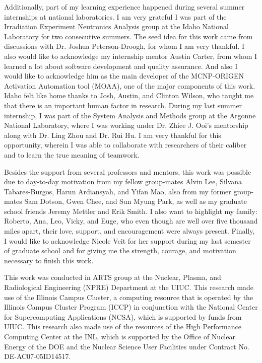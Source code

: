 \documentclass{uiucthesis2021}
\begin{document}
\begin{acknowledgments}
Additionally, part of my learning experience happened during several summer internships at national laboratories.
I am very grateful I was part of the Irradiation Experiment Neutronics Analysis group at the Idaho National Laboratory for two consecutive summers.
The seed idea for this work came from discussions with Dr. Joshua Peterson-Droogh, for whom I am very thankful.
I also would like to acknowledge my internship mentor Austin Carter, from whom I learned a lot about software development and quality assurance.
And also I would like to acknowledge him as the main developer of the MCNP-ORIGEN Activation Automation tool (MOAA), one of the major components of this work.
Idaho felt like home thanks to Josh, Austin, and Clinton Wilson, who taught me that there is an important human factor in research.
During my last summer internship, I was part of the System Analysis and Methods group at the Argonne National Laboratory, where I was working under Dr. Zhiee J. Ooi's mentorship along with Dr. Ling Zhou and Dr. Rui Hu.
I am very thankful for this opportunity, wherein I was able to collaborate with researchers of their caliber and to learn the true meaning of teamwork.

Besides the support from several professors and mentors, this work was possible due to day-to-day motivation from my fellow group-mates Alvin Lee, Silvana Tabares-Burgos, Harun Ardiansyah, and Yifan Mao, also from my former group-mates Sam Dotson, Gwen Chee, and Sun Myung Park, as well as my graduate school friends Jeremy Mettler and Erik Smith.
I also want to highlight my family: Roberto, Ana, Leo, Vicky, and Euge, who even though are well over five thousand miles apart, their love, support, and encouragement were always present.
Finally, I would like to acknowledge Nicole Veit for her support during my last semester of graduate school and for giving me the strength, courage, and motivation necessary to finish this work.

This work was conducted in ARTS group at the Nuclear, Plasma, and Radiological Engineering (NPRE) Department at the \gls*{UIUC}.
This research made use of the Illinois Campus Cluster, a computing resource that is operated by the Illinois Campus Cluster Program (ICCP) in conjunction with the National Center for Supercomputing Applications (NCSA), which is supported by funds from \gls*{UIUC}.
This research also made use of the resources of the High Performance Computing Center at the \gls*{INL}, which is supported by the Office of Nuclear Energy of the \gls*{DOE} and the Nuclear Science User Facilities under Contract No. DE-AC07-05ID14517.

\end{acknowledgments}
\end{document}

